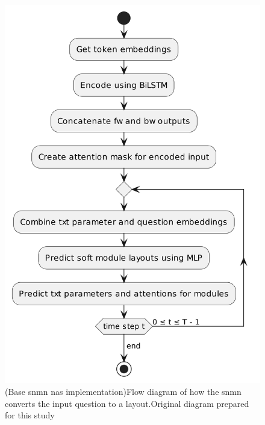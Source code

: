 \begin{figure}[htbp]
    \centering
    \includegraphics[width=.55\textwidth,keepaspectratio]{content/chapters/methodology/model_adaptation/figures/controller-layout-base-snmn.png}
    \captionsource(Base \gls{snmn} \gls{nas} implementation){Flow diagram of how the \gls{snmn} converts the input question to a layout.\label{fig:base_snmn_input_unit}}{Original diagram prepared for this study}
\end{figure}

